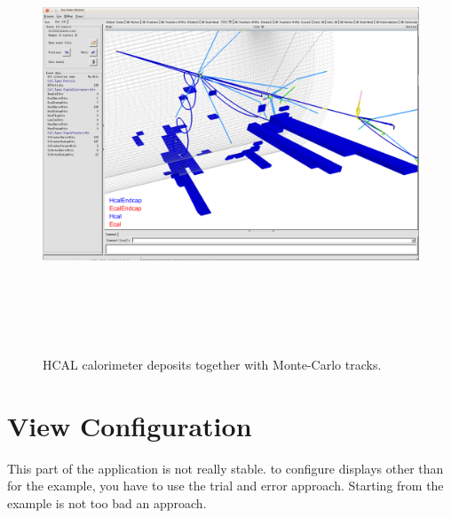 \documentclass[10pt,a4paper]{article}
\begin{document}
\newpage
\noindent
\begin{figure}[h]
  \begin{center}
    \includegraphics[height=130mm] {DDEve_8}
    \caption{HCAL calorimeter deposits together with Monte-Carlo tracks.}
    \label{fig:DDEve_5}
  \end{center}
\end{figure}


\section{View Configuration}
\label{sec:ddeve-user-manual-display-configuration}
\noindent
This part of the \DDE application is not really stable. to configure displays
other than for the  example, you have to use the trial and error 
approach. Starting from the  example is not too bad an approach.


\newpage
\begin{thebibliography}{9}

\end{thebibliography}
\end{document}
